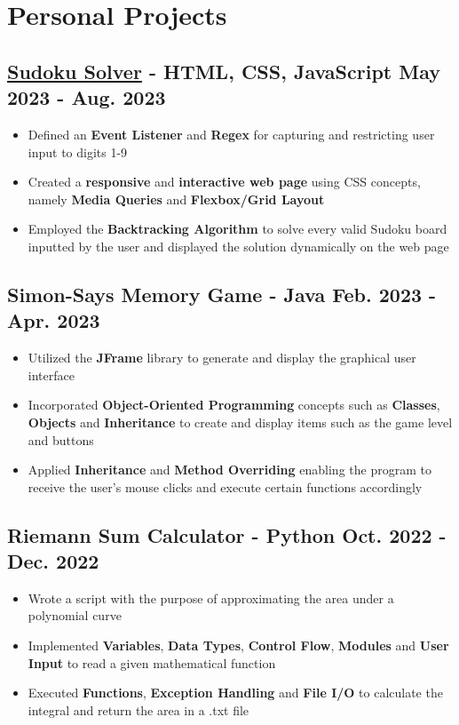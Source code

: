 \documentclass[10pt]{article}
\newcommand{\rightindent}[1]{\hfill{\textmd{#1}}}
\begin{document}
\section{Personal Projects}
\subsection{\href{https://nicholas489.github.io/Sudoku_Solver/}{Sudoku Solver} \textmd{- HTML, CSS, JavaScript} \rightindent{May 2023 - Aug. 2023}}
\begin{itemize}
    \item Defined an \textbf{Event Listener} and \textbf{Regex} for capturing and restricting user input to digits 1-9
    \item Created a \textbf{responsive} and \textbf{interactive web page} using CSS concepts, namely \textbf{Media Queries} and \textbf{Flexbox/Grid Layout}
    \item Employed the \textbf{Backtracking Algorithm} to solve every valid Sudoku board inputted by the user and displayed the solution dynamically on the web page
\end{itemize}
\subsection{Simon-Says Memory Game \textmd{- Java} \rightindent{Feb. 2023 - Apr. 2023}}
\begin{itemize} 
    \item Utilized the \textbf{JFrame} library to generate and display the graphical user interface
    \item Incorporated \textbf{Object-Oriented Programming} concepts such as \textbf{Classes}, \textbf{Objects} and \textbf{Inheritance} to create and display items such as the game level and buttons
    \item Applied \textbf{Inheritance} and \textbf{Method Overriding} enabling the program to receive the user’s mouse clicks and execute certain functions accordingly
\end{itemize}
\subsection{Riemann Sum Calculator \textmd{- Python} \rightindent{Oct. 2022 - Dec. 2022}}
\begin{itemize} 
    \item Wrote a script with the purpose of approximating the area under a polynomial curve
    \item Implemented \textbf{Variables}, \textbf{Data Types}, \textbf{Control Flow}, \textbf{Modules} and \textbf{User Input} to read a given mathematical function
    \item Executed \textbf{Functions}, \textbf{Exception Handling} and \textbf{File I/O} to calculate the integral and return the area in a .txt file
\end{itemize}
\end{document}
